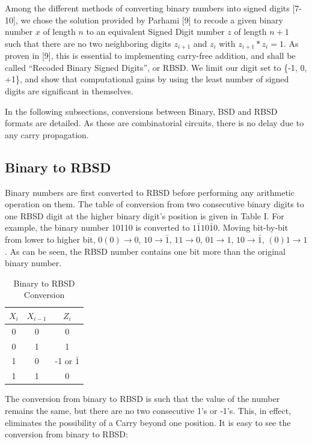 \documentclass[conference]{IEEEtran}
\begin{document}
Among the different methods of converting binary numbers into signed digits [7-10], we chose  the solution provided by Parhami [9] to recode a given binary number $x$ of length $n$ to an equivalent Signed Digit number $z$ of length $n+1$ such that there are no two neighboring digits $z_{i+1}$ and $z_{i}$ with $z_{i+1} * z_{i} = 1$. As proven in [9], this is essential to implementing carry-free addition, and shall be called ``Recoded Binary Signed Digits'', or RBSD. We limit our digit set to \{-1, 0, +1\}, and show that computational gains by using the least number of signed digits are significant in themselves.

In the following subsections, conversions between Binary, BSD and RBSD formats are detailed. As these are combinatorial circuits, there is no delay due to any carry propagation.

\subsection{Binary to RBSD}

Binary numbers are first converted to RBSD before performing any arithmetic operation on them. The table of conversion from two consecutive binary digits to one RBSD digit at the higher binary digit’s position is given in Table I. For example, the binary number 10110 is converted to $1\bar{1}10\bar{1}0$. Moving bit-by-bit from lower to higher bit, $0(0) \to 0$, $10 \to \bar{1}$, $11 \to 0$, $01 \to 1$, $10 \to \bar{1}$, $(0)1 \to 1$. As can be seen, the RBSD number contains one bit more than the original binary number.

\vspace{-.5em}
\begin{table}[h!]
  \centering
  \caption{Binary to RBSD Conversion}
  \label{tab:table1}
  \begin{tabular}{|c|c||c|}
    \hline
    $X_{i}$ & $X_{i-1}$ & $Z_{i}$ \\
    \hline
    \hline
    0 & 0 & 0\\
    \hline
    0 & 1 & 1\\
    \hline
    1 & 0 & -1 or $\bar{1}$\\
    \hline
    1 & 1 & 0\\
    \hline
  \end{tabular}
\end{table}

The conversion from binary to RBSD is such that the value of the number remains the same, but there are no two consecutive 1’s or -1’s. This, in effect, eliminates the possibility of a Carry beyond one position. It is easy to see the conversion from binary to RBSD:
\end{document}
